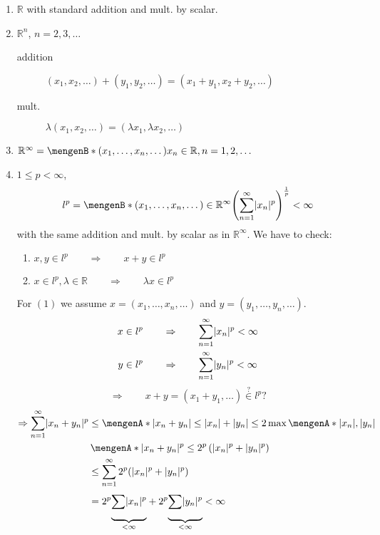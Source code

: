 \begin{beispiele}
	\begin{enumerate}[1)]
		\item $\mathbb{R}$ with standard addition and mult. by scalar.
		\item $\mathbb{R}^n$, $n=2,3, \dots$
		\begin{description}
			\item[addition] $(x_1,x_2,\dots) + (y_1,y_2, \dots) = (x_1+y_1,x_2+y_2, \dots)$ 
			\item[mult.] $ \lambda (x_1,x_2,\dots) = (\lambda x_1, \lambda x_2, \dots)$
		\end{description} 
		\item $\mathbb{R}^{\infty} = \set[(x_1,\dots,x_n,\dots)]{x_n \in \mathbb{R}, n=1,2,\dots}$
		\item $1 \leq p < \infty$, 
		\[
			l^p = \set[(x_1,\dots,x_n, \dots) \in \mathbb{R}^{\infty}]{\left( \sum_{n=1}^{\infty} \abs{x_n}^p \right)^{\frac{1}{p}} < \infty}
		\]
		with the same addition and mult. by scalar as in $\mathbb{R}^{\infty}$. We have to check:
		\begin{enumerate}[(1)]
			\item $x,y \in l^p \qquad \Rightarrow \qquad x+y \in l^p$
			\item $x \in l^p, \lambda \in \mathbb{R} \qquad \Rightarrow \qquad \lambda x \in l^p$ 
		\end{enumerate}
		For $(1)$ we assume $x = (x_1, \dots, x_n, \dots)$ and $y = (y_1, \dots, y_n, \dots)$.
		\begin{align*}
			x \in l^p \qquad &\Rightarrow \qquad \sum_{n=1}^{\infty}\lvert x_n\rvert^p < \infty \\
			y \in l^p \qquad &\Rightarrow \qquad \sum_{n=1}^{\infty}\lvert y_n\rvert^p < \infty
		\end{align*}
		\[
			\Rightarrow \qquad  x+y = (x_1+y_1, \dots) \stackrel{?}{\in } l^p?
		\]
		\begin{align*}
			\Rightarrow \sum_{n=1}^{\infty}\abs{x_n+y_n}^p & \leq \set{\abs{x_n+y_n} \leq \abs{x_n}+ \abs{y_n} \leq 2 \max \set{\abs{x_n},\abs{y_n}}} \\
			& \,\set{\abs{x_n+y_n}^p \leq 2^p \left( \abs{x_n}^p + \abs{y_n}^p \right)} \\
			&\leq \sum_{n=1}^{\infty}2^p (\abs{x_n}^p + \abs{y_n}^p) \\
			&= 2^p \underset{< \infty}{\underbrace{\sum_{}^{}\abs{x_n}^p}}+ 2^p \underset{< \infty}{\underbrace{\sum_{}^{}\abs{y_n}^p}} < \infty
		\end{align*}

\end{enumerate}
\end{beispiele}
